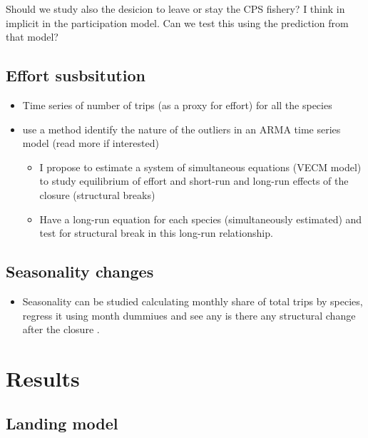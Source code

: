 \documentclass[
]{article}
\providecommand{\tightlist}{%
  \setlength{\itemsep}{0pt}\setlength{\parskip}{0pt}}
\begin{document}
Should we study also the desicion to leave or stay the CPS fishery? I
think in implicit in the participation model. Can we test this using the
prediction from that model?

\hypertarget{effort-susbsitution}{%
\subsection{Effort susbsitution}\label{effort-susbsitution}}

\begin{itemize}
\tightlist
\item
  Time series of number of trips (as a proxy for effort) for all the
  species
\item
  \citet{richerson2017} use a method identify the nature of the outliers
  in an ARMA time series model (read more if interested)

  \begin{itemize}
  \tightlist
  \item
    I propose to estimate a system of simultaneous equations (VECM
    model) to study equilibrium of effort and short-run and long-run
    effects of the closure (structural breaks)
  \item
    Have a long-run equation for each species (simultaneously estimated)
    and test for structural break in this long-run relationship.
  \end{itemize}
\end{itemize}

\hypertarget{seasonality-changes}{%
\subsection{Seasonality changes}\label{seasonality-changes}}

\begin{itemize}
\tightlist
\item
  Seasonality can be studied calculating monthly share of total trips by
  species, regress it using month dummiues and see any is there any
  structural change after the closure \citep{richerson2017}.
\end{itemize}

\hypertarget{results}{%
\section{Results}\label{results}}

\hypertarget{landing-model}{%
\subsection{Landing model}\label{landing-model}}
\end{document}

